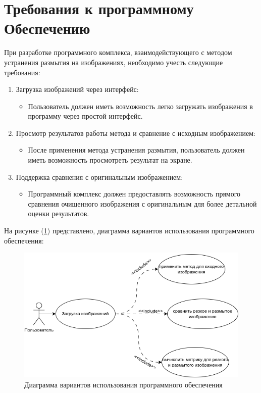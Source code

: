 \section{Требования к программному Обеспечению}

При разработке программного комплекса, взаимодействующего с методом устранения размытия на изображениях, необходимо учесть следующие требования:

\begin{enumerate}
    \item Загрузка изображений через интерфейс:
    \begin{itemize}
        \item Пользователь должен иметь возможность легко загружать изображения в программу через простой интерфейс.
    \end{itemize}

    \item Просмотр результатов работы метода и сравнение с исходным изображением:
    \begin{itemize}
        \item После применения метода устранения размытия, пользователь должен иметь возможность просмотреть результат на экране.
    \end{itemize}

    \item Поддержка сравнения с оригинальным изображением:
    \begin{itemize}
        \item Программный комплекс должен предоставлять возможность прямого сравнения очищенного изображения с оригинальным для более детальной оценки результатов.
    \end{itemize}
\end{enumerate}

На рисунке (\ref{fig:use-case}) представлено, диаграмма вариантов использования программного обеспечения: 
\begin{figure}[H]
	\centering
	\includegraphics[width=0.5\linewidth]{assets/use-case-diagram.png}
	\caption{Диаграмма вариантов использования программного обеспечения}
	\label{fig:use-case}
\end{figure}


